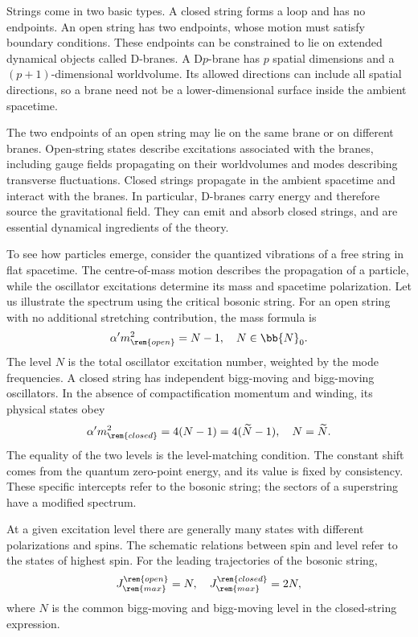 Strings come in two basic types. A closed string forms a loop and has no endpoints. An open string has two endpoints, whose motion must satisfy boundary conditions. These endpoints can be constrained to lie on extended dynamical objects called D-branes. A D$p$-brane has $p$ spatial dimensions and a $(p+1)$-dimensional worldvolume. Its allowed directions can include all spatial directions, so a brane need not be a lower-dimensional surface inside the ambient spacetime.

The two endpoints of an open string may lie on the same brane or on different branes. Open-string states describe excitations associated with the branes, including gauge fields propagating on their worldvolumes and modes describing transverse fluctuations. Closed strings propagate in the ambient spacetime and interact with the branes. In particular, D-branes carry energy and therefore source the gravitational field. They can emit and absorb closed strings, and are essential dynamical ingredients of the theory.

To see how particles emerge, consider the quantized vibrations of a free string in flat spacetime. The centre-of-mass motion describes the propagation of a particle, while the oscillator excitations determine its mass and spacetime polarization. Let us illustrate the spectrum using the critical bosonic string. For an open string with no additional stretching contribution, the mass formula is
\begin{equation}
    \alpha' m_{\rem{open}}^2 = N - 1,\quad N \in \bb{N}_0.
\end{equation}
The level $N$ is the total oscillator excitation number, weighted by the mode frequencies. A closed string has independent bigg-moving and bigg-moving oscillators. In the absence of compactification momentum and winding, its physical states obey
\begin{equation}
    \alpha' m_{\rem{closed}}^2 = 4(N - 1) = 4(\widetilde N - 1),\quad N = \widetilde N.
\end{equation}
The equality of the two levels is the level-matching condition. The constant shift comes from the quantum zero-point energy, and its value is fixed by consistency. These specific intercepts refer to the bosonic string; the sectors of a superstring have a modified spectrum.

At a given excitation level there are generally many states with different polarizations and spins. The schematic relations between spin and level refer to the states of highest spin. For the leading trajectories of the bosonic string,
\begin{equation}
    J_{\rem{max}}^{\rem{open}} = N,\quad J_{\rem{max}}^{\rem{closed}} = 2N,
\end{equation}
where $N$ is the common bigg-moving and bigg-moving level in the closed-string expression.

